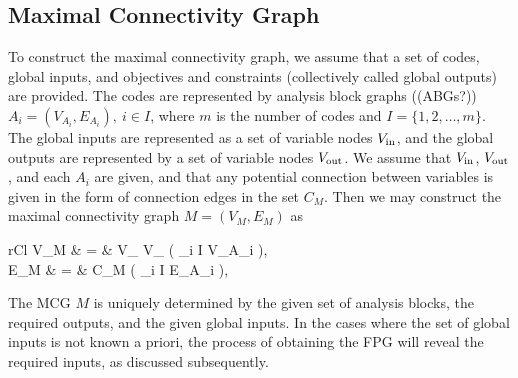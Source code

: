 \subsection{Maximal Connectivity Graph}
	\label{ss:MCG}
	To construct the maximal connectivity graph, we assume that a set of codes, global inputs, and objectives and constraints (collectively called global outputs) are provided. 
	The codes are represented by analysis block graphs ((ABGs?)) $A_i=(V_{A_i},E_{A_i}), \ i\in I$, where $m$ is the number of codes and $I=\{1,2,\ldots,m\}$. 
	The global inputs are represented as a set of variable nodes $V_\textrm{in}$, and the global outputs are represented by a set of variable nodes $V_\textrm{out}$. 
	We assume that $V_\textrm{in}$, $V_\textrm{out}$, and each $A_i$ are given, and that any potential connection between variables is given in the form of connection edges in the set $C_M$. 
	Then we may construct the maximal connectivity graph $M=(V_M,E_M)$ as
	\begin{IEEEeqnarray*}{rCl}
	V_M & = & V_ \cup V_ \cup \left( \bigcup_{i \in I} V_{A_i} \right), \\
	E_M & = & C_M \cup \left( \bigcup_{i \in I} E_{A_i} \right),
	\end{IEEEeqnarray*}
	The MCG $M$ is uniquely determined by the given set of analysis blocks, the required outputs, and the given global inputs. 
	In the cases where the set of global inputs is not known a priori, the process of obtaining the FPG will reveal the required inputs, as discussed subsequently.

